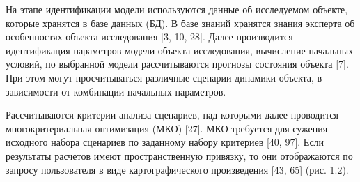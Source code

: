 На этапе идентификации модели используются
данные об исследуемом объекте, которые хранятся
в базе данных (БД). В базе знаний хранятся знания
эксперта об особенностях объекта исследования
[3, 10, 28]. Далее  производится идентификация параметров
модели объекта исследования, вычисление начальных
условий, по выбранной модели рассчитываются
прогнозы состояния объекта [7]. При этом могут
просчитываться различные сценарии динамики
объекта, в зависимости от комбинации начальных
параметров.

Рассчитываются критерии анализа сценариев,
над которыми далее проводится многокритериальная
оптимизация (МКО) [27]. МКО требуется для сужения
исходного набора сценариев по заданному набору
критериев [40, 97]. Если результаты расчетов имеют
пространственную привязку, то они отображаются
по запросу пользователя в виде картографического
произведения [43, 65] (рис. 1.2).

\section{}
